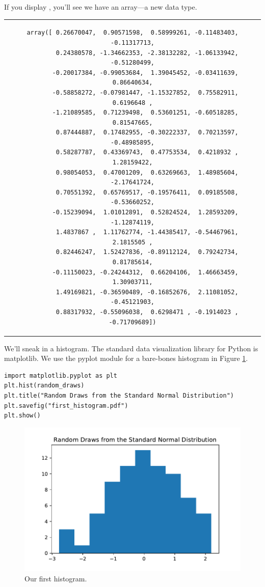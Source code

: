 \documentclass{article}
\begin{document}
\noindent If you display , you'll see we have an array---a new data type.

\begin{center}
\begin{tabular}{c}
\begin{lstlisting}[backgroundcolor=\color{white}, numbers = none]
    array([ 0.26670047,  0.90571598,  0.58999261, -0.11483403, -0.11317713,
        0.24380578, -1.34662353, -2.38132282, -1.06133942, -0.51280499,
       -0.20017384, -0.99053684,  1.39045452, -0.03411639,  0.86640634,
       -0.58858272, -0.07981447, -1.15327852,  0.75582911,  0.6196648 ,
       -1.21089585,  0.71239498,  0.53601251, -0.60518285,  0.81547665,
        0.87444887,  0.17482955, -0.30222337,  0.70213597, -0.48985895,
        0.58287787,  0.43369743,  0.47753534,  0.4218932 ,  1.28159422,
        0.98054053,  0.47001209,  0.63269663,  1.48985604, -2.17641724,
        0.70551392,  0.65769517, -0.19576411,  0.09185508, -0.53660252,
       -0.15239094,  1.01012891,  0.52824524,  1.28593209, -1.12874119,
        1.4837867 ,  1.11762774, -1.44385417, -0.54467961,  2.1815505 ,
        0.82446247,  1.52427836, -0.89112124,  0.79242734,  0.81785614,
       -0.11150023, -0.24244312,  0.66204106,  1.46663459,  1.30903711,
        1.49169821, -0.36590489, -0.16852676,  2.11081052, -0.45121903,
        0.88317932, -0.55096038,  0.6298471 , -0.1914023 , -0.71709689])
\end{lstlisting}
\end{tabular}
\end{center}


\noindent We'll sneak in a histogram. The standard data visualization library for Python is matplotlib. We use the pyplot module for a bare-bones histogram in Figure \ref{fig:hist}.

\begin{lstlisting}
import matplotlib.pyplot as plt
plt.hist(random_draws)
plt.title("Random Draws from the Standard Normal Distribution")
plt.savefig("first_histogram.pdf")
plt.show()    
\end{lstlisting}


\begin{figure}
    \centering
    \includegraphics[width = .59\textwidth]{figures/first_histogram.pdf}
    \caption{Our first histogram.}
    \label{fig:hist}
\end{figure}
\end{document}
